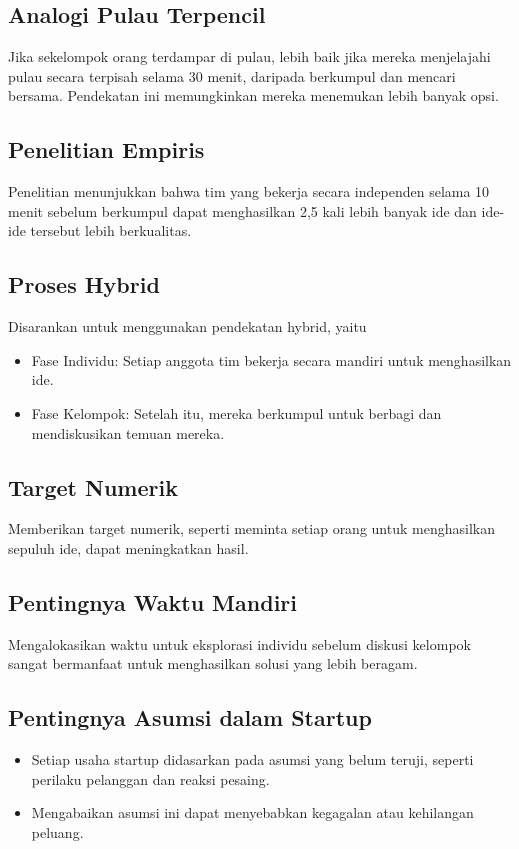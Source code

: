 \documentclass{article}
\begin{document}
\subsection{Analogi Pulau Terpencil}
Jika sekelompok orang terdampar di pulau, lebih baik jika mereka menjelajahi pulau secara terpisah selama 30 menit, daripada berkumpul dan mencari bersama. Pendekatan ini memungkinkan mereka menemukan lebih banyak opsi.

\subsection{Penelitian Empiris}
Penelitian menunjukkan bahwa tim yang bekerja secara independen selama 10 menit sebelum berkumpul dapat menghasilkan 2,5 kali lebih banyak ide dan ide-ide tersebut lebih berkualitas.

\subsection{Proses Hybrid}
Disarankan untuk menggunakan pendekatan hybrid, yaitu
\begin{itemize}
    \item Fase Individu: Setiap anggota tim bekerja secara mandiri untuk menghasilkan ide.
    \item Fase Kelompok: Setelah itu, mereka berkumpul untuk berbagi dan mendiskusikan temuan mereka.
\end{itemize}

\subsection{Target Numerik}
Memberikan target numerik, seperti meminta setiap orang untuk menghasilkan sepuluh ide, dapat meningkatkan hasil.

\subsection{Pentingnya Waktu Mandiri}
Mengalokasikan waktu untuk eksplorasi individu sebelum diskusi kelompok sangat bermanfaat untuk menghasilkan solusi yang lebih beragam.

\subsection{Pentingnya Asumsi dalam Startup}
\begin{itemize}
    \item Setiap usaha startup didasarkan pada asumsi yang belum teruji, seperti perilaku pelanggan dan reaksi pesaing.
    \item Mengabaikan asumsi ini dapat menyebabkan kegagalan atau kehilangan peluang.
\end{itemize}
\end{document}
